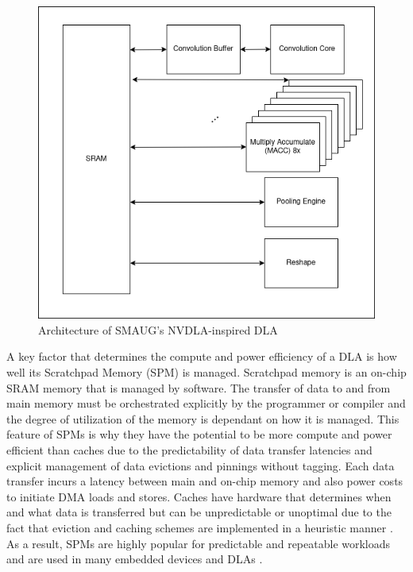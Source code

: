 \begin{figure}[thb!]
\centering
\includegraphics[scale=0.5]{Figures/nvdla.png}
\decoRule
\caption[Reduction]{Architecture of SMAUG's NVDLA-inspired DLA}
\label{fig:nvdla}
\end{figure}

A key factor that determines the compute and power efficiency of a DLA is how
well its Scratchpad Memory (SPM) is managed. Scratchpad memory is an on-chip
SRAM memory that is managed by software. The transfer of data to and from main
memory must be orchestrated explicitly by the programmer or compiler and the
degree of utilization of the memory is dependant on how it is managed.  This
feature of SPMs is why they have the potential to be more compute and power
efficient than caches due to the predictability of data transfer latencies and
explicit management of data evictions and pinnings without tagging.  Each data
transfer incurs a latency between main and on-chip memory and also power costs
to initiate DMA loads and stores. Caches have hardware that determines when and
what data is transferred but can be unpredictable or unoptimal due to the fact
that eviction and caching schemes are implemented in a heuristic manner
\cite{manyCore}. As a result, SPMs are highly popular for predictable and
repeatable workloads and are used in many embedded devices \cite{graphColoring}
and DLAs \cite{onsram}.


